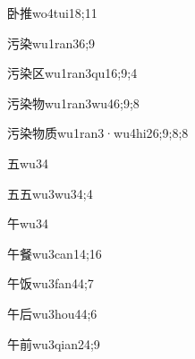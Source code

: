 \begin{verbete}{卧推}{wo4tui1}{8;11}
\end{verbete}

\begin{verbete}{污染}{wu1ran3}{6;9}
\end{verbete}

\begin{verbete}{污染区}{wu1ran3qu1}{6;9;4}
\end{verbete}

\begin{verbete}{污染物}{wu1ran3wu4}{6;9;8}
\end{verbete}

\begin{verbete}{污染物质}{wu1ran3·wu4hi2}{6;9;8;8}
\end{verbete}

\begin{verbete}{五}{wu3}{4}
\end{verbete}

\begin{verbete}{五五}{wu3wu3}{4;4}
\end{verbete}

\begin{verbete}{午}{wu3}{4}
\end{verbete}

\begin{verbete}{午餐}{wu3can1}{4;16}
\end{verbete}

\begin{verbete}{午饭}{wu3fan4}{4;7}
\end{verbete}

\begin{verbete}{午后}{wu3hou4}{4;6}
\end{verbete}

\begin{verbete}{午前}{wu3qian2}{4;9}
\end{verbete}

